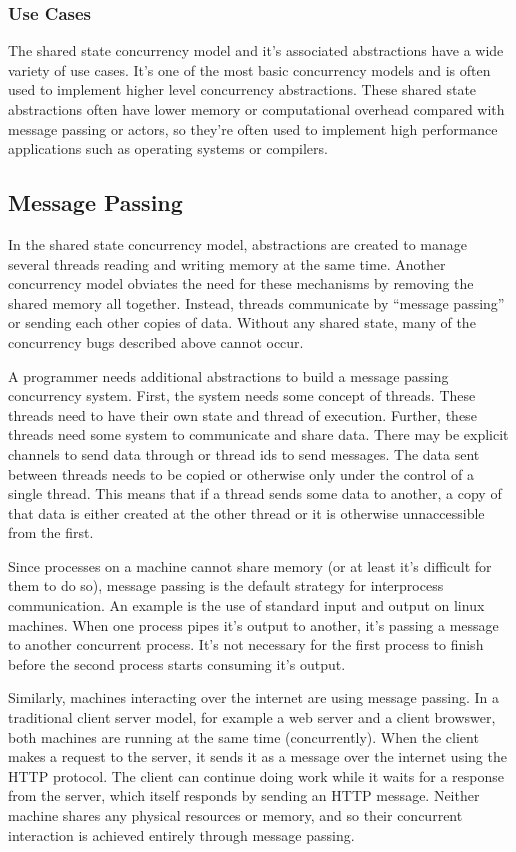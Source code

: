 \documentclass{article}
\begin{document}
\subsubsection{Use Cases}
The shared state concurrency model and it's associated abstractions
have a wide variety of use cases. It's one of the most basic
concurrency models and is often used to implement higher level
concurrency abstractions. These shared state abstractions often
have lower memory or computational overhead compared with message
passing or actors, so they're often used to implement high
performance applications such as operating systems or compilers.


\subsection{Message Passing}
In the shared state concurrency model, abstractions are created
to manage several threads reading and writing memory at the same
time. Another concurrency model obviates the need for these
mechanisms by removing the shared memory all together. Instead,
threads communicate by ``message passing'' or sending each other
copies of data. Without any shared state, many of the concurrency
bugs described above cannot occur.

A programmer needs additional abstractions to build a message
passing concurrency system. First, the system needs some concept
of threads. These threads need to have their own state and thread
of execution. Further, these threads need some system to communicate
and share data. There may be explicit channels to send data through
or thread ids to send messages. The data sent between threads needs
to be copied or otherwise only under the control of a single thread.
This means that if a thread sends some data to another, a copy of
that data is either created at the other thread or it is otherwise
unnaccessible from the first.

Since processes on a machine cannot share memory (or at least it's
difficult for them to do so), message passing is the default
strategy for interprocess communication. An example is the use of
standard input and output on linux machines. When one process pipes
it's output to another, it's passing a message to another concurrent
process. It's not necessary for the first process to finish before
the second process starts consuming it's output.

Similarly, machines interacting over the internet are using message
passing. In a traditional client server model, for example a web
server and a client browswer, both machines are running at the same
time (concurrently). When the client makes a request to the server,
it sends it as a message over the internet using the HTTP protocol.
The client can continue doing work while it waits for a response
from the server, which itself responds by sending an HTTP message.
Neither machine shares any physical resources or memory, and so
their concurrent interaction is achieved entirely through message
passing.
\end{document}
